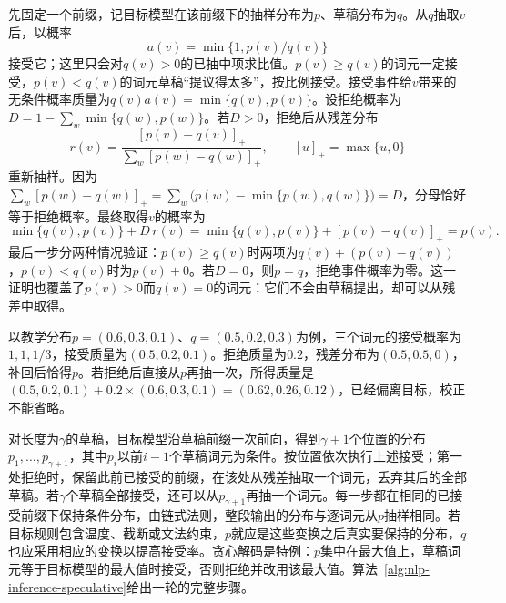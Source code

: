 先固定一个前缀，记目标模型在该前缀下的抽样分布为$p$、草稿分布为$q$。从$q$抽取$v$后，以概率
\begin{equation}
 a(v)=\min\{1,p(v)/q(v)\}
 \label{eq:nlp-inference-speculative-accept}
\end{equation}
接受它；这里只会对$q(v)>0$的已抽中项求比值。$p(v)\geq q(v)$的词元一定接受，$p(v)<q(v)$的词元草稿“提议得太多”，按比例接受。接受事件给$v$带来的无条件概率质量为$q(v)a(v)=\min\{q(v),p(v)\}$。设拒绝概率为$D=1-\sum_w\min\{q(w),p(w)\}$。若$D>0$，拒绝后从残差分布
\begin{equation}
 r(v)=\frac{[p(v)-q(v)]_+}{\sum_w[p(w)-q(w)]_+},
 \qquad [u]_+=\max\{u,0\}
 \label{eq:nlp-inference-speculative-residual}
\end{equation}
重新抽样。因为$\sum_w[p(w)-q(w)]_+=\sum_w\bigl(p(w)-\min\{p(w),q(w)\}\bigr)=D$，分母恰好等于拒绝概率。最终取得$v$的概率为
\begin{equation}
 \min\{q(v),p(v)\}+D\,r(v)=\min\{q(v),p(v)\}+[p(v)-q(v)]_+=p(v).
 \label{eq:nlp-inference-speculative-proof}
\end{equation}
最后一步分两种情况验证：$p(v)\geq q(v)$时两项为$q(v)+(p(v)-q(v))$，$p(v)<q(v)$时为$p(v)+0$。若$D=0$，则$p=q$，拒绝事件概率为零。这一证明也覆盖了$p(v)>0$而$q(v)=0$的词元：它们不会由草稿提出，却可以从残差中取得。

以教学分布$p=(0.6,0.3,0.1)$、$q=(0.5,0.2,0.3)$为例，三个词元的接受概率为$1,1,1/3$，接受质量为$(0.5,0.2,0.1)$。拒绝质量为$0.2$，残差分布为$(0.5,0.5,0)$，补回后恰得$p$。若拒绝后直接从$p$再抽一次，所得质量是$(0.5,0.2,0.1)+0.2\times(0.6,0.3,0.1)=(0.62,0.26,0.12)$，已经偏离目标，校正不能省略。

对长度为$\gamma$的草稿，目标模型沿草稿前缀一次前向，得到$\gamma+1$个位置的分布$p_1,\ldots,p_{\gamma+1}$，其中$p_i$以前$i-1$个草稿词元为条件。按位置依次执行上述接受；第一处拒绝时，保留此前已接受的前缀，在该处从残差抽取一个词元，丢弃其后的全部草稿。若$\gamma$个草稿全部接受，还可以从$p_{\gamma+1}$再抽一个词元。每一步都在相同的已接受前缀下保持条件分布，由链式法则，整段输出的分布与逐词元从$p$抽样相同。若目标规则包含温度、截断或文法约束，$p$就应是这些变换之后真实要保持的分布，$q$也应采用相应的变换以提高接受率。贪心解码是特例：$p$集中在最大值上，草稿词元等于目标模型的最大值时接受，否则拒绝并改用该最大值。算法~\ref{alg:nlp-inference-speculative}给出一轮的完整步骤。


